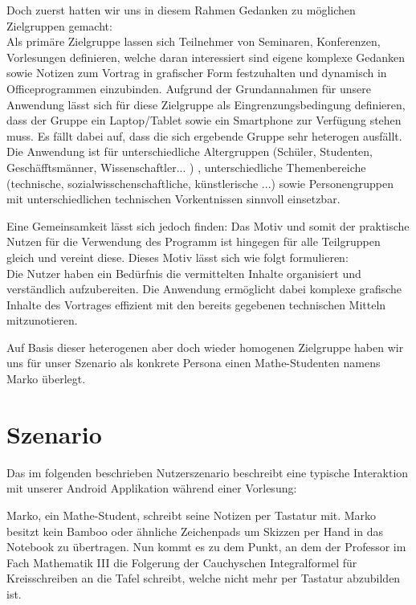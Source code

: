 \documentclass{chi-ext}
\begin{document}
Doch zuerst hatten wir uns in diesem Rahmen Gedanken zu möglichen Zielgruppen gemacht: \\
Als primäre Zielgruppe lassen sich Teilnehmer von Seminaren, Konferenzen, Vorlesungen definieren, welche daran interessiert sind eigene komplexe Gedanken sowie Notizen zum Vortrag in grafischer Form festzuhalten und dynamisch in Officeprogrammen einzubinden.
Aufgrund der Grundannahmen für unsere Anwendung lässt sich für diese Zielgruppe als Eingrenzungsbedingung definieren, dass der Gruppe ein Laptop/Tablet sowie ein Smartphone zur Verfügung stehen muss. 
Es fällt dabei auf, dass die sich ergebende Gruppe sehr heterogen ausfällt. Die Anwendung ist für unterschiedliche Altergruppen (Schüler, Studenten, Geschäfftsmänner, Wissenschaftler... ) , unterschiedliche Themenbereiche (technische, sozialwisschenschaftliche, künstlerische ...) sowie Personengruppen mit unterschiedlichen technischen Vorkentnissen sinnvoll einsetzbar.

Eine Gemeinsamkeit lässt sich jedoch finden: Das Motiv und somit der praktische Nutzen für die Verwendung des Programm ist hingegen für alle Teilgruppen gleich und vereint diese.
Dieses Motiv lässt sich wie folgt formulieren:\\
Die Nutzer haben ein Bedürfnis die vermittelten Inhalte organisiert und verständlich aufzubereiten. Die Anwendung ermöglicht dabei komplexe grafische Inhalte des Vortrages effizient mit den bereits gegebenen technischen Mitteln mitzunotieren.

Auf Basis dieser heterogenen aber doch wieder homogenen Zielgruppe haben wir uns für unser Szenario als konkrete Persona einen Mathe-Studenten namens Marko überlegt.


\section{Szenario}
Das im folgenden beschrieben Nutzerszenario beschreibt eine typische Interaktion mit unserer Android Applikation während einer Vorlesung:


Marko, ein Mathe-Student, schreibt seine Notizen per Tastatur mit. Marko besitzt kein Bamboo oder ähnliche Zeichenpads um Skizzen per Hand in das Notebook zu übertragen. Nun kommt es zu dem Punkt, an dem der Professor im Fach Mathematik III die Folgerung der Cauchyschen Integralformel für Kreisschreiben an die Tafel schreibt, welche nicht mehr per Tastatur abzubilden ist.
\end{document}
